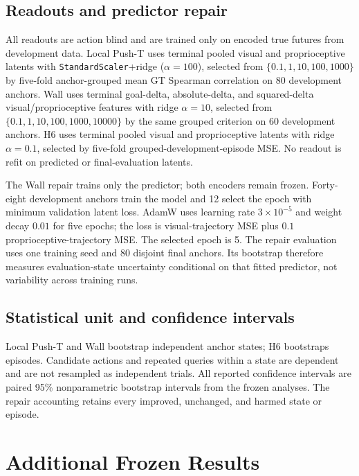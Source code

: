 \subsection{Readouts and predictor repair}

All readouts are action blind and are trained only on encoded true futures from development data. Local Push-T uses terminal pooled visual and proprioceptive latents with \texttt{StandardScaler}+ridge ($\alpha=100$), selected from $\{0.1,1,10,100,1000\}$ by five-fold anchor-grouped mean GT Spearman correlation on 80 development anchors. Wall uses terminal goal-delta, absolute-delta, and squared-delta visual/proprioceptive features with ridge $\alpha=10$, selected from $\{0.1,1,10,100,1000,10000\}$ by the same grouped criterion on 60 development anchors. H6 uses terminal pooled visual and proprioceptive latents with ridge $\alpha=0.1$, selected by five-fold grouped-development-episode MSE. No readout is refit on predicted or final-evaluation latents.

The Wall repair trains only the predictor; both encoders remain frozen. Forty-eight development anchors train the model and 12 select the epoch with minimum validation latent loss. AdamW uses learning rate $3\times10^{-5}$ and weight decay $0.01$ for five epochs; the loss is visual-trajectory MSE plus $0.1$ proprioceptive-trajectory MSE. The selected epoch is 5. The repair evaluation uses one training seed and 80 disjoint final anchors. Its bootstrap therefore measures evaluation-state uncertainty conditional on that fitted predictor, not variability across training runs.

\subsection{Statistical unit and confidence intervals}

Local Push-T and Wall bootstrap independent anchor states; H6 bootstraps episodes. Candidate actions and repeated queries within a state are dependent and are not resampled as independent trials. All reported confidence intervals are paired 95\% nonparametric bootstrap intervals from the frozen analyses. The repair accounting retains every improved, unchanged, and harmed state or episode.

\section{Additional Frozen Results}

